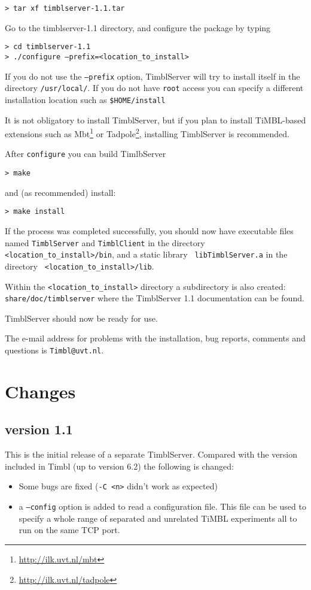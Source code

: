 \documentclass{report}
\begin{document}
{\tt > tar xf timblserver-1.1.tar}

Go to the timblserver-1.1 directory, and configure the package by typing

{\tt > cd timblserver-1.1} \\
{\tt > ./configure --prefix=<location\_to\_install>}

If you do not use the {\tt --prefix} option, TimblServer will try to
install itself in the directory {\tt /usr/local/}.  If you do not have
{\tt root} access you can specify a different installation location
such as {\tt \$HOME/install}

It is not obligatory to install TimblServer, but if you plan to
install TiMBL-based extensions such as
Mbt\footnote{\url{http://ilk.uvt.nl/mbt}} or
Tadpole\footnote{\url{http://ilk.uvt.nl/tadpole}}, installing
TimblServer is recommended.

After {\tt configure} you can build TimlbServer

{\tt > make}

and (as recommended) install:

{\tt > make install }

If the process was completed successfully, you should now have
executable files named {\tt TimblServer} and {\tt TimblClient} in the
directory {\tt <location\_to\_install>/bin}, and a static library {\tt
  libTimblServer.a} in the directory {\tt
  <location\_to\_install>/lib}.

Within the {\tt <location\_to\_install>} directory a subdirectory is
also created: {\tt share/doc/timblserver} where the TimblServer 1.1
documentation can be found.

TimblServer should now be ready for use. 

The e-mail address for problems with the installation, bug reports, comments and questions is {\tt Timbl@uvt.nl}.

\chapter{Changes}
\label{changes}

\section{version 1.1}

This is the initial release of a separate TimblServer.
Compared with the version included in Timbl (up to version 6.2) the following is changed:

\begin{itemize}

\item Some bugs are fixed ({\tt -C <n>} didn't work as expected)
\item a {\tt --config} option is added to read a configuration file. This
  file can be used to specify a whole range of separated and unrelated
  TiMBL experiments all to run on the same TCP port.

\end{itemize}
\end{document}

